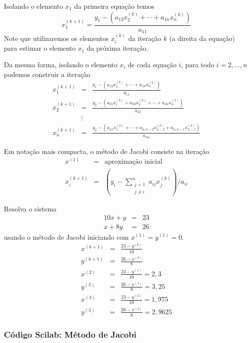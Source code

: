 Isolando o elemento $x_1$ da primeira equação temos
\begin{equation}
x_1^{(k+1)}= \frac{y_1 - \left(a_{12}x_2^{(k)}+\cdots+a_{1n}x_n^{(k)}\right)}{a_{11}}
\end{equation}
Note que utilizaremos os elementos $x_i^{(k)}$ da iteração $k$ (a direita da equação) para estimar o elemento $x_1$ da próxima iteração.

Da mesma forma, isolando o elemento $x_i$ de cada equação $i$, para todo $i=2,...,n$ podemos construir a iteração
\begin{eqnarray*}
x_1^{(k+1)}&=&\frac{y_1 - \left(a_{12}x_2^{(k)}+\cdots+a_{1n}x_n^{(k)}\right)}{a_{11}}\\
x_2^{(k+1)}&=&\frac{y_2 - \left(a_{21}x_1^{(k)}+a_{23}x_3^{(k)}+\cdots+a_{2n}x_n^{(k)}\right)}{a_{22}}\\
&\vdots&\\
x_n^{(k+1)}&=&\frac{y_2 - \left(a_{n1}x_1^{(k)}+\cdots+a_{n,n-2}x_{n-2}^{(k)}+a_{n,n-1}x_{n-1}^{(k)}\right)}{a_{nn}}
\end{eqnarray*}

Em notação mais compacta, o método de Jacobi consiste na iteração
\begin{eqnarray*}
  x^{(1)}   &=& \text{aproximação inicial}\\
  x_i^{(k+1)} &=& \left(y_i - \sum_{\substack{j=1\\j\ne i}}^{n} a_{ij}x_j^{(k)} \right)/{a_{ii}}
\end{eqnarray*}

\begin{ex}
Resolva o sistema
\begin{eqnarray*}
 10x+y&=&23\\
 x+8y &=&26
\end{eqnarray*}
usando o método de Jacobi iniciando com $x^{(1)}=y^{(1)}=0$.
\begin{eqnarray*}
x^{(k+1)}&=&\frac{23-y^{(k)}}{10}\\
y^{(k+1)}&=&\frac{26-x^{(k)}}{8}\\
x^{(2)}&=&\frac{23-y^{(1)}}{10}=2,3\\
y^{(2)}&=&\frac{26-x^{(1)}}{8}=3,25\\
x^{(3)}&=&\frac{23-y^{(2)}}{10}=1,975 \\
y^{(3)}&=&\frac{26-x^{(2)}}{8}=2,9625
\end{eqnarray*}
\end{ex}

\ifisscilab
\subsubsection{Código Scilab: Método de Jacobi}

